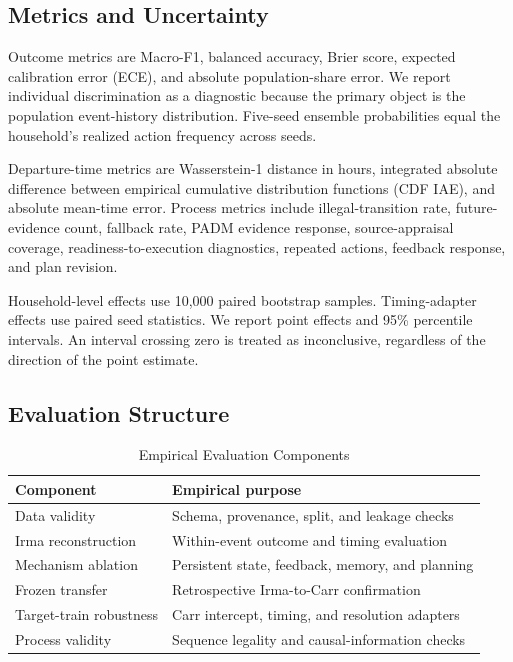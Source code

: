 \documentclass[journal]{IEEEtran}
\begin{document}
\subsection{Metrics and Uncertainty}
Outcome metrics are Macro-F1, balanced accuracy, Brier score, expected
calibration error (ECE), and absolute population-share error. We report
individual discrimination as a diagnostic because the primary object is the
population event-history distribution. Five-seed ensemble probabilities equal
the household's realized action frequency across seeds.

Departure-time metrics are Wasserstein-1 distance in hours, integrated absolute
difference between empirical cumulative distribution functions (CDF IAE), and
absolute mean-time error. Process metrics include illegal-transition rate,
future-evidence count, fallback rate, PADM evidence response, source-appraisal
coverage, readiness-to-execution diagnostics, repeated actions, feedback
response, and plan revision.

Household-level effects use 10,000 paired bootstrap samples. Timing-adapter
effects use paired seed statistics. We report point effects and 95\% percentile
intervals. An interval crossing zero is treated as inconclusive, regardless of
the direction of the point estimate.

\subsection{Evaluation Structure}
\begin{table}[!t]
\caption{Empirical Evaluation Components}
\label{tab:matrix}
\centering
\small
\begin{tabular}{p{}p{}}
\toprule
Component & Empirical purpose\\
\midrule
Data validity & Schema, provenance, split, and leakage checks\\
Irma reconstruction & Within-event outcome and timing evaluation\\
Mechanism ablation & Persistent state, feedback, memory, and planning\\
Frozen transfer & Retrospective Irma-to-Carr confirmation\\
Target-train robustness & Carr intercept, timing, and resolution adapters\\
Process validity & Sequence legality and causal-information checks\\
\bottomrule
\end{tabular}
\end{table}
\end{document}
